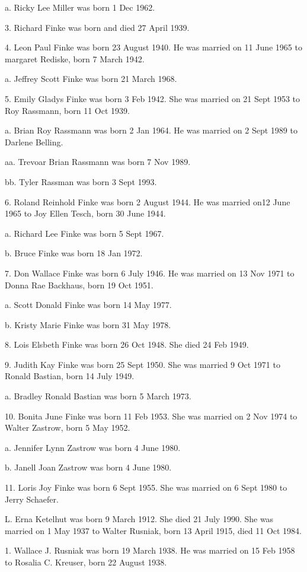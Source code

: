 \documentclass[a4paper]{article}
\begin{document}
a. Ricky Lee Miller was born 1 Dec 1962.

3. Richard Finke was born and died 27 April 1939.

4. Leon Paul Finke was born 23 August 1940.  He was married on 11 June 1965 to margaret Rediske, born 7 March 1942.

a. Jeffrey Scott Finke was born 21 March 1968.

5. Emily Gladys Finke was born 3 Feb 1942.  She was married on 21 Sept 1953 to Roy Rassmann, born 11 Oct 1939. 

a. Brian Roy Rassmann was born 2 Jan 1964.  He was married on 2 Sept 1989 to Darlene Belling.

aa. Trevoar Brian Rassmann was born 7 Nov 1989.

bb. Tyler Rassman was born 3 Sept 1993.

6. Roland Reinhold Finke was born 2 August 1944.  He was married on12 June 1965 to Joy Ellen Tesch, born 30 June 1944.

a. Richard Lee Finke was born 5 Sept 1967.

b. Bruce Finke was born 18 Jan 1972.

7. Don Wallace Finke was born 6 July 1946.  He was married on 13 Nov 1971 to Donna Rae Backhaus, born 19 Oct 1951.

a. Scott Donald Finke was born 14 May 1977.

b. Kristy Marie Finke was born 31 May 1978.

8. Lois Elsbeth Finke was born 26 Oct 1948.  She died 24 Feb 1949.

9. Judith Kay Finke was born 25 Sept 1950.  She was married 9 Oct 1971 to Ronald Bastian, born 14 July 1949.

a. Bradley Ronald Bastian was born 5 March 1973.

10.  Bonita June Finke was born 11 Feb 1953.  She was married on 2 Nov 1974 to Walter Zastrow, born 5 May 1952.

a. Jennifer Lynn Zastrow was born 4 June 1980.

b. Janell Joan Zastrow was born 4 June 1980.

11. Loris Joy Finke was born 6 Sept 1955.  She was married on 6 Sept 1980 to Jerry Schaefer.

L. Erna Ketelhut was born 9 March 1912.  She died 21 July 1990.  She was married on 1 May 1937 to Walter Rusniak, born 13 April 1915, died 11 Oct 1984.

1. Wallace J. Rusniak was born 19 March 1938.  He was married on 15 Feb 1958 to Rosalia C. Kreuser, born 22 August 1938.
\end{document}
